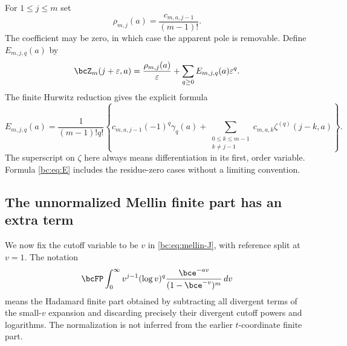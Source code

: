 For $1\le j\le m$ set
\begin{equation}\label{bc:eq:rho}
 \rho_{m,j}(a)=\frac{c_{m,a,j-1}}{(m-1)!}.
\end{equation}
The coefficient may be zero, in which case the apparent pole is
removable. Define $E_{m,j,q}(a)$ by
\begin{equation}\label{bc:eq:Z-Laurent}
 \bcZ_m(j+\varepsilon,a)=\frac{\rho_{m,j}(a)}\varepsilon
                         +\sum_{q\ge0}E_{m,j,q}(a)\varepsilon^q.
\end{equation}
The finite Hurwitz reduction gives the explicit formula
\begin{equation}\label{bc:eq:E}
 E_{m,j,q}(a)=\frac{1}{(m-1)!q!}
 \left\{c_{m,a,j-1}(-1)^q\gamma_q(a)
       +\sum_{\substack{0\le k\le m-1\\k\ne j-1}}
               c_{m,a,k}\zeta^{(q)}(j-k,a)\right\}.
\end{equation}
The superscript on $\zeta$ here always means differentiation in its
first, order variable. Formula \eqref{bc:eq:E} includes the residue-zero
cases without a limiting convention.

\subsection{The unnormalized Mellin finite part has an extra term}

We now fix the cutoff variable to be $v$ in \eqref{bc:eq:mellin-J}, with
reference split at $v=1$. The notation
\[
 \bcFP\int_0^\infty v^{j-1}(\log v)^q
                   \frac{\bce^{-av}}{(1-\bce^{-v})^m}\,dv
\]
means the Hadamard finite part obtained by subtracting all divergent
terms of the small-$v$ expansion and discarding precisely their
divergent cutoff powers and logarithms. The normalization is not
inferred from the earlier $t$-coordinate finite part.

